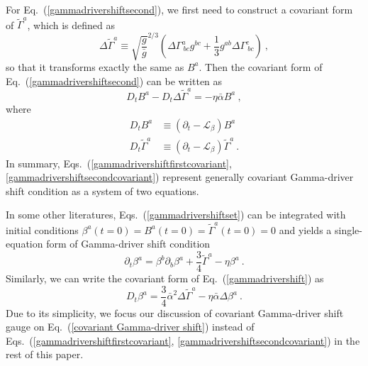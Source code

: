 For Eq.~(\ref{gammadrivershiftsecond}), we first need to construct a covariant form of ${\tilde \Gamma}^{a}$, which is defined as
\begin{equation}
\Delta {\tilde \Gamma}^{a} \equiv \sqrt{\frac{g}{{\bar g}}}^{2/3}\left(\Delta \Gamma^{a}_{~bc}g^{bc} + \frac{1}{3}g^{ab}\Delta \Gamma^{c}_{~bc}\right) \ ,
\end{equation}
so that it transforms exactly the same as $B^{a}$. Then the covariant form of Eq.~(\ref{gammadrivershiftsecond}) can be written as
\begin{equation}\label{gammadrivershiftsecondcovariant}
	D_{t}B^{a} - D_{t}\Delta {\tilde \Gamma}^{a}  = - \eta {\bar \alpha}B^{a} \ , 
\end{equation}
where
\begin{subequations}
\begin{align}
D_{t}B^{a} & \equiv \left(\partial_{t} - \mathcal{L}_{\beta}\right)B^{a}\\
D_{t}{\tilde \Gamma}^{a} & \equiv \left(\partial_{t} - \mathcal{L}_{\beta}\right){\tilde \Gamma}^{a} \ .
\end{align}
\end{subequations}
In summary, Eqs.~(\ref{gammadrivershiftfirstcovariant}, \ref{gammadrivershiftsecondcovariant}) represent generally covariant Gamma-driver shift condition as a system of two equations. 

In some other literatures\cite{vanMeter:2006vi}, Eqs.~(\ref{gammadrivershiftset}) can be integrated with initial conditions $\beta^{a}\left(t=0\right) = B^{a}\left(t=0\right) = {\tilde \Gamma}^{a}\left(t = 0\right) = 0$ and yields a single-equation form of Gamma-driver shift condition
\begin{equation}\label{gammadrivershift}
\partial_{t}\beta^{a} = \beta^{b}\partial_{b}\beta^{a} + \frac{3}{4}{\tilde \Gamma}^{a} - \eta \beta^{a} \ .
\end{equation} 
Similarly, we can write the covariant form of Eq.~(\ref{gammadrivershift}) as
\begin{equation}\label{covariant Gamma-driver shift}
D_{t}\beta^{a} = \frac{3}{4}{\bar \alpha}^{2}\Delta {\tilde \Gamma}^{a} - \eta {\bar \alpha}\Delta\beta^{a} \ .
\end{equation}
Due to its simplicity, we focus our discussion of covariant Gamma-driver shift gauge on Eq.~(\ref{covariant Gamma-driver shift}) instead of Eqs.~(\ref{gammadrivershiftfirstcovariant}, \ref{gammadrivershiftsecondcovariant}) in the rest of this paper.

